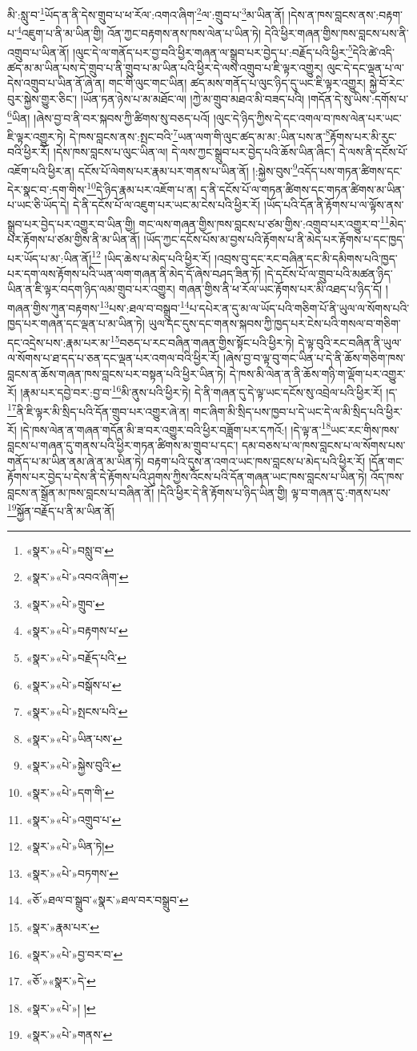 མི་:སླུ་བ་\footnote{«སྣར་»«པེ་»བསླུ་བ་}ཡོད་ན་ནི་དེས་གྲུབ་པ་ཕ་རོལ་:འགའ་ཞིག་\footnote{«སྣར་»«པེ་»འབའ་ཞིག་}ལ་:གྲུབ་པ་\footnote{«སྣར་»«པེ་»གྲུབ་}མ་ཡིན་ནོ། །དེས་ན་ཁས་བླངས་ནས་:བརྟག་པ་\footnote{«སྣར་»«པེ་»བརྟགས་པ་}འཇུག་པ་ནི་མ་ཡིན་གྱི། འོན་ཀྱང་བརྟགས་ནས་ཁས་ལེན་པ་ཡིན་ཏེ། དེའི་ཕྱིར་གཞན་གྱིས་ཁས་བླངས་པས་ནི་འགྲུབ་པ་ཡིན་ནོ། །ལུང་དེ་ལ་གནོད་པར་བྱ་བའི་ཕྱིར་གཞན་ལ་སྒྲུབ་པར་བྱེད་པ་:བརྗོད་པའི་ཕྱིར་\footnote{«སྣར་»«པེ་»བརྗོད་པའི་}དེའི་ཚེ་འདི་ཚད་མ་མ་ཡིན་པས་དེ་གྲུབ་པ་ནི་གྲུབ་པ་མ་ཡིན་པའི་ཕྱིར་དེ་ལས་འགྲུབ་པ་ཇི་ལྟར་འགྱུར། ལུང་དེ་དང་ལྡན་པ་ལ་དེས་འགྲུབ་པ་ཡིན་ནོ་ཞེ་ན། གང་གི་ལུང་གང་ཡིན། ཚད་མས་གནོད་པ་ལུང་ཉིད་དུ་ཡང་ཇི་ལྟར་འགྱུར། སྐྱེ་བོ་རེང་བུར་སྐྱེས་གྱུར་ཅིང་། །ཡོན་ཏན་ཉེས་པ་མ་མཐོང་ལ། །ཀྱེ་མ་གྲུབ་མཐའ་མི་བཟད་པའི། །གདོན་དེ་སུ་ཡིས་:དགོས་པ་\footnote{«སྣར་»«པེ་»བསྒོས་པ་}ཡིན། །ཞེས་བྱ་བ་ནི་བར་སྐབས་ཀྱི་ཚིགས་སུ་བཅད་པའོ། །ལུང་དེ་ཉིད་ཀྱིས་དེ་དང་འགལ་བ་ཁས་ལེན་པར་ཡང་ཇི་ལྟར་འགྱུར་ཏེ། དེ་ཁས་བླངས་ནས་:སྤང་བའི་\footnote{«སྣར་»«པེ་»སྤངས་པའི་}ཡན་ལག་གི་ལུང་ཚད་མ་མ་:ཡིན་པས་ན་\footnote{«སྣར་»«པེ་»ཡིན་པས་}རྟོགས་པར་མི་རུང་བའི་ཕྱིར་རོ། །དེས་ཁས་བླངས་པ་ལུང་ཡིན་ལ། དེ་ལས་ཀྱང་སྒྲུབ་པར་བྱེད་པའི་ཆོས་ཡིན་ཞིང་། དེ་ལས་ནི་དངོས་པོ་འཇོག་པའི་ཕྱིར་ན། དངོས་པོ་ལེགས་པར་རྣམ་པར་གནས་པ་ཡིན་ནོ། །:སྐྱེས་བུས་\footnote{«སྣར་»«པེ་»སྐྱེས་བུའི་}འདོད་པས་གཏན་ཚིགས་དང་དེར་སྣང་བ་:དག་གིས་\footnote{«སྣར་»«པེ་»དག་གི་}དེ་ཉིད་རྣམ་པར་འཇོག་པ་ན། ད་ནི་དངོས་པོ་ལ་གཏན་ཚིགས་དང་གཏན་ཚིགས་མ་ཡིན་པ་ཡང་ཅི་ཡོད་དེ། དེ་ནི་དངོས་པོ་ལ་འཇུག་པར་ཡང་མ་ངེས་པའི་ཕྱིར་རོ། །ཡོད་པའི་དོན་ནི་རྟོགས་པ་ལ་ལྟོས་ནས་སྒྲུབ་པར་བྱེད་པར་འགྱུར་བ་ཡིན་གྱི། གང་ལས་གཞན་གྱིས་ཁས་བླངས་པ་ཙམ་གྱིས་:འགྲུབ་པར་འགྱུར་བ་\footnote{«སྣར་»«པེ་»འགྲུབ་པ་}མེད་པར་རྟོགས་པ་ཙམ་གྱིས་ནི་མ་ཡིན་ནོ། །ཡོད་ཀྱང་དངོས་པོས་མ་བྱས་པའི་རྟོགས་པ་ནི་མེད་པར་རྟོགས་པ་དང་ཁྱད་པར་ཡོད་པ་མ་:ཡིན་ནོ།\footnote{«སྣར་»«པེ་»ཡིན་ཏེ།} །ཡིད་ཆེས་པ་མེད་པའི་ཕྱིར་རོ། །འབྲས་བུ་དང་རང་བཞིན་དང་མི་དམིགས་པའི་ཁྱད་པར་དག་ལས་རྟོགས་པའི་ཡན་ལག་གཞན་ནི་མེད་དོ་ཞེས་བཤད་ཟིན་ཏོ། །དེ་དངོས་པོ་ལ་གྲུབ་པའི་མཚན་ཉིད་ཡིན་ན་ཇི་ལྟར་བདག་ཉིད་ལམ་གྲུབ་པར་འགྱུར། གཞན་གྱིས་ནི་ཕ་རོལ་ཡང་རྟོགས་པར་མི་འཐད་པ་ཉིད་དོ། །གཞན་གྱིས་ཀུན་བརྟགས་\footnote{«སྣར་»«པེ་»བཏགས་}པས་:ཐལ་བ་བསྒྲུབ་\footnote{«ཅོ་»ཐལ་བ་སྒྲུབ་«སྣར་»ཐལ་བར་བསྒྲུབ་}པ་དཔེར་ན་དུ་མ་ལ་ཡོད་པའི་གཅིག་པོ་ནི་ཡུལ་ལ་སོགས་པའི་ཁྱད་པར་གཞན་དང་ལྡན་པ་མ་ཡིན་ཏེ། ཡུལ་དང་དུས་དང་གནས་སྐབས་ཀྱི་ཁྱད་པར་ངེས་པའི་གསལ་བ་གཅིག་དང་འདྲེས་པས་:རྣམ་པར་མ་\footnote{«སྣར་»རྣམ་པར་}བཅད་པ་རང་བཞིན་གཞན་གྱིས་སྟོང་པའི་ཕྱིར་ཏེ། དེ་ལྟ་བུའི་རང་བཞིན་ནི་ཡུལ་ལ་སོགས་པ་ཐ་དད་པ་ཅན་དང་ལྡན་པར་འགལ་བའི་ཕྱིར་རོ། །ཞེས་བྱ་བ་ལྟ་བུ་གང་ཡིན་པ་དེ་ནི་ཆོས་གཅིག་ཁས་བླངས་ན་ཆོས་གཞན་ཁས་བླངས་པར་བསྟན་པའི་ཕྱིར་ཡིན་ཏེ། དེ་ཁས་མི་ལེན་ན་ནི་ཆོས་གཉི་ག་ལྡོག་པར་འགྱུར་རོ། །རྣམ་པར་དབྱེ་བར་:བྱ་བ་\footnote{«སྣར་»«པེ་»བྱ་བར་བ་}མི་ནུས་པའི་ཕྱིར་ཏེ། དེ་ནི་གཞན་དུ་དེ་ལྟ་ཡང་དངོས་སུ་འབྲེལ་པའི་ཕྱིར་རོ། །ད་\footnote{«ཅོ་»«སྣར་»དེ་}ནི་ཇི་ལྟར་མི་སྲིད་པའི་དོན་གྲུབ་པར་འགྱུར་ཞེ་ན། གང་ཞིག་མི་སྲིད་པས་ཁྱབ་པ་དེ་ཡང་དེ་ལ་མི་སྲིད་པའི་ཕྱིར་རོ། །དེ་ཁས་ལེན་ན་གཞན་གདོན་མི་ཟ་བར་འགྱུར་བའི་ཕྱིར་བཟློག་པར་དཀའོ:། །དེ་ལྟ་ན་\footnote{«སྣར་»«པེ་»། །}ཡང་རང་གིས་ཁས་བླངས་པ་གཞན་དུ་གནས་པའི་ཕྱིར་གཏན་ཚིགས་མ་གྲུབ་པ་དང་། དམ་བཅས་པ་ལ་ཁས་བླངས་པ་ལ་སོགས་པས་གནོད་པ་མ་ཡིན་ནམ་ཞེ་ན་མ་ཡིན་ཏེ། བརྟག་པའི་དུས་ན་འགའ་ཡང་ཁས་བླངས་པ་མེད་པའི་ཕྱིར་རོ། །དོན་གང་རྟོགས་པར་བྱེད་པ་དེས་ནི་དེ་རྟོགས་པའི་ཤུགས་ཀྱིས་འོངས་པའི་དོན་གཞན་ཡང་ཁས་བླངས་པ་ཡིན་ཏེ། འོད་ཁས་བླངས་ན་སྒྲོན་མ་ཁས་བླངས་པ་བཞིན་ནོ། །དེའི་ཕྱིར་དེ་ནི་རྟོགས་པ་ཉིད་ཡིན་གྱི། ལྟ་བ་གཞན་དུ་:གནས་པས་\footnote{«སྣར་»«པེ་»གནས་}སྐྱོན་བརྗོད་པ་ནི་མ་ཡིན་ནོ། 